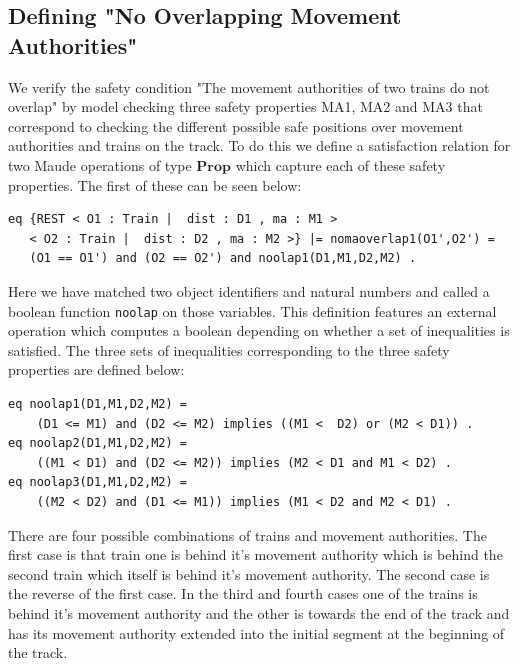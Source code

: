 \subsection*{Defining "No Overlapping Movement Authorities"}
We verify the safety condition "The movement authorities of two trains do not overlap" by model checking three safety properties MA1, MA2 and MA3 that correspond to checking the different possible safe positions over movement authorities and trains on the track. To do this we define a satisfaction relation for two Maude operations of type $\mathbf{Prop}$ which capture each of these safety properties. The first of these can be seen below:

\begin{lstlisting}[caption = The no overlapping movement authorities property]
eq {REST < O1 : Train |  dist : D1 , ma : M1 > 
   < O2 : Train |  dist : D2 , ma : M2 >} |= nomaoverlap1(O1',O2') = 
   (O1 == O1') and (O2 == O2') and noolap1(D1,M1,D2,M2) .
\end{lstlisting}

Here we have matched two object identifiers and natural numbers and called a boolean function \texttt{noolap} on those variables. This definition features an external operation which computes a boolean depending on whether a set of inequalities is satisfied. The three sets of inequalities corresponding to the three safety properties are defined below:

\begin{lstlisting}[caption = The no overlap operations]
eq noolap1(D1,M1,D2,M2) = 
    (D1 <= M1) and (D2 <= M2) implies ((M1 <  D2) or (M2 < D1)) .  
eq noolap2(D1,M1,D2,M2) = 
    ((M1 < D1) and (D2 <= M2)) implies (M2 < D1 and M1 < D2) .
eq noolap3(D1,M1,D2,M2) = 
    ((M2 < D2) and (D1 <= M1)) implies (M1 < D2 and M2 < D1) .

\end{lstlisting}

There are four possible combinations of trains and movement authorities.  The first case is that train one is behind it's movement authority which is behind the second train which itself is behind it's movement authority. The second case is the reverse of the first case. In the third and fourth cases  one of the trains is behind it's movement authority and the other is towards the end of the track and has its movement authority extended into the initial segment at the beginning of the track.


